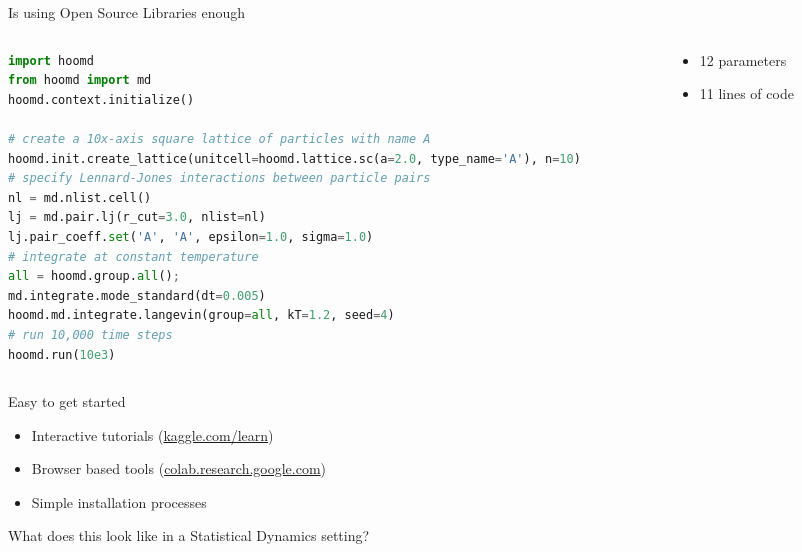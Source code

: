 \documentclass[aspectratio=169, 14pt]{beamer}
\begin{document}
\begin{frame}[fragile]{Is using Open Source Libraries enough}

  \begin{columns}
    \begin{column}{0.7\textwidth}
      \scriptsize
      \begin{lstlisting}[language=python]
import hoomd
from hoomd import md
hoomd.context.initialize()

# create a 10x-axis square lattice of particles with name A
hoomd.init.create_lattice(unitcell=hoomd.lattice.sc(a=2.0, type_name='A'), n=10)
# specify Lennard-Jones interactions between particle pairs
nl = md.nlist.cell()
lj = md.pair.lj(r_cut=3.0, nlist=nl)
lj.pair_coeff.set('A', 'A', epsilon=1.0, sigma=1.0)
# integrate at constant temperature
all = hoomd.group.all();
md.integrate.mode_standard(dt=0.005)
hoomd.md.integrate.langevin(group=all, kT=1.2, seed=4)
# run 10,000 time steps
hoomd.run(10e3)
      \end{lstlisting}
    \end{column}

    \begin{column}{0.3\textwidth}
      \vspace{3em}
      \begin{itemize}
        \item 12 parameters
        \item 11 lines of code
      \end{itemize}
    \end{column}
  \end{columns}

\end{frame}


\begin{frame}{Easy to get started}
  \begin{itemize}
    \item Interactive tutorials (\url{kaggle.com/learn})
    \item Browser based tools (\url{colab.research.google.com})
    \item Simple installation processes
  \end{itemize}
\end{frame}


\begin{frame}{}

  \color{usydred}
  \LARGE
  What does this look like in a Statistical Dynamics setting?

\end{frame}
\end{document}
